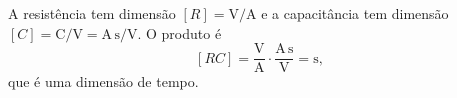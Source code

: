 A resistência tem dimensão $[R]=\mathrm{V/A}$ e a capacitância tem dimensão $[C]=\mathrm{C/V} = \mathrm{A\,s/V}$. O produto é
\[
[RC]=\frac{\mathrm{V}}{\mathrm{A}}\cdot\frac{\mathrm{A\,s}}{\mathrm{V}}=\mathrm{s},
\]
que é uma dimensão de tempo. 